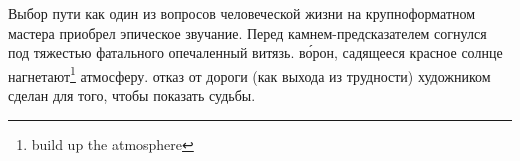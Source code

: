 Выбор пути как один из  вопросов человеческой жизни на крупноформатном  мастера приобрел эпическое звучание.
Перед камнем-предсказателем согнулся под тяжестью фатального  опечаленный витязь.  в\'{о}рон, садящееся красное солнце нагнетают\footnote{build up the atmosphere} атмосферу.  отказ от  дороги (как выхода из трудности) художником сделан для того, чтобы показать  судьбы.